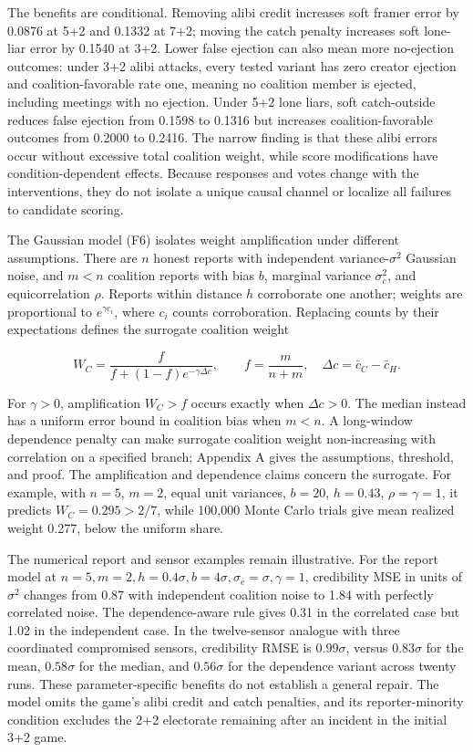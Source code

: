 \documentclass[
  12pt,
]{article}
\begin{document}
The benefits are conditional. Removing alibi credit increases soft
framer error by 0.0876 at 5+2 and 0.1332 at 7+2; moving the catch
penalty increases soft lone-liar error by 0.1540 at 3+2. Lower false
ejection can also mean more no-ejection outcomes: under 3+2 alibi
attacks, every tested variant has zero creator ejection and
coalition-favorable rate one, meaning no coalition member is ejected,
including meetings with no ejection. Under 5+2 lone liars, soft
catch-outside reduces false ejection from 0.1598 to 0.1316 but increases
coalition-favorable outcomes from 0.2000 to 0.2416. The narrow finding
is that these alibi errors occur without excessive total coalition
weight, while score modifications have condition-dependent effects.
Because responses and votes change with the interventions, they do not
isolate a unique causal channel or localize all failures to candidate
scoring.

The Gaussian model (F6) isolates weight amplification under different
assumptions. There are \(n\) honest reports with independent
variance-\(\sigma^2\) Gaussian noise, and \(m<n\) coalition reports with
bias \(b\), marginal variance \(\sigma_c^2\), and equicorrelation
\(\rho\). Reports within distance \(h\) corroborate one another; weights
are proportional to \(e^{\gamma c_i}\), where \(c_i\) counts
corroboration. Replacing counts by their expectations defines the
surrogate coalition weight

\[
W_C=\frac{f}{f+(1-f)e^{-\gamma\Delta c}},\qquad
f=\frac{m}{n+m},\quad \Delta c=\bar c_C-\bar c_H.
\]

For \(\gamma>0\), amplification \(W_C>f\) occurs exactly when
\(\Delta c>0\). The median instead has a uniform error bound in
coalition bias when \(m<n\). A long-window dependence penalty can make
surrogate coalition weight non-increasing with correlation on a
specified branch; Appendix A gives the assumptions, threshold, and
proof. The amplification and dependence claims concern the surrogate.
For example, with \(n=5\), \(m=2\), equal unit variances, \(b=20\),
\(h=0.43\), \(\rho=\gamma=1\), it predicts \(W_C=0.295>2/7\), while
100,000 Monte Carlo trials give mean realized weight 0.277, below the
uniform share.

The numerical report and sensor examples remain illustrative. For the
report model at
\(n=5,m=2,h=0.4\sigma,b=4\sigma,\sigma_c=\sigma,\gamma=1\), credibility
MSE in units of \(\sigma^2\) changes from 0.87 with independent
coalition noise to 1.84 with perfectly correlated noise. The
dependence-aware rule gives 0.31 in the correlated case but 1.02 in the
independent case. In the twelve-sensor analogue with three coordinated
compromised sensors, credibility RMSE is \(0.99\sigma\), versus
\(0.83\sigma\) for the mean, \(0.58\sigma\) for the median, and
\(0.56\sigma\) for the dependence variant across twenty runs. These
parameter-specific benefits do not establish a general repair. The model
omits the game's alibi credit and catch penalties, and its
reporter-minority condition excludes the 2+2 electorate remaining after
an incident in the initial 3+2 game.
\end{document}
